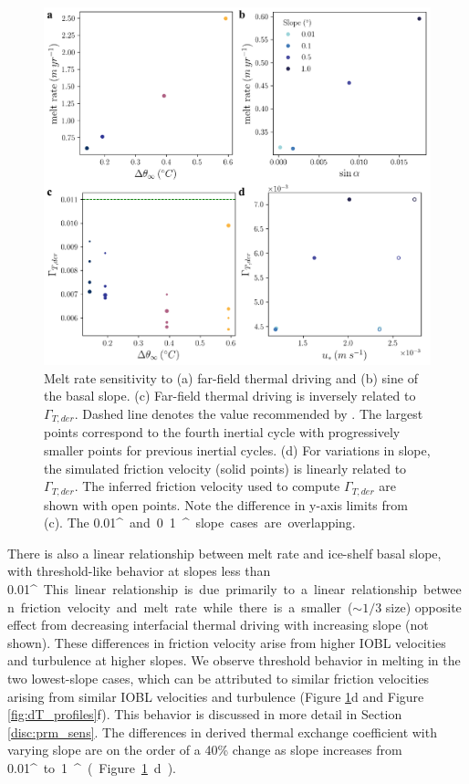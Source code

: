 \documentclass[tc, manuscript]{copernicus}
\begin{document}
\begin{figure}[t]
\includegraphics[width=12cm]{fig7.pdf}
\caption{Melt rate sensitivity to (a) far-field thermal driving and (b) sine of the basal slope. (c) Far-field thermal driving is inversely related to $\Gamma_{T,der}$. Dashed line denotes the value recommended by \citet{jenkins_observation_2010}. The largest points correspond to the fourth inertial cycle with progressively smaller points for previous inertial cycles. (d) For variations in slope, the simulated friction velocity (solid points) is linearly related to $\Gamma_{T,der}$. The inferred friction velocity used to compute $\Gamma_{T,der}$ are shown with open points. Note the difference in y-axis limits from (c). The 0.01\unit{^{\circ}} and 0.1\unit{^{\circ}} slope cases are overlapping.}
\label{fig:melt_sensitivity}
\end{figure}

There is also a linear relationship between melt rate and ice-shelf basal slope, with threshold-like behavior at slopes less than 0.01\unit{^{\circ}}. This linear relationship is due primarily to a linear relationship between friction velocity and melt rate while there is a smaller ($\sim\!1/3$ size) opposite effect from decreasing interfacial thermal driving with increasing slope (not shown). These differences in friction velocity arise from higher IOBL velocities and turbulence at higher slopes. We observe threshold behavior in melting in the two lowest-slope cases, which can be attributed to similar friction velocities arising from similar IOBL velocities and turbulence (Figure \ref{fig:melt_sensitivity}d and Figure \ref{fig:dT_profiles}f). This behavior is discussed in more detail in Section \ref{disc:prm_sens}. The differences in derived thermal exchange coefficient with varying slope are on the order of a 40\% change as slope increases from 0.01\unit{^{\circ}} to 1\unit{^{\circ}} (Figure \ref{fig:melt_sensitivity}d).  
\end{document}
